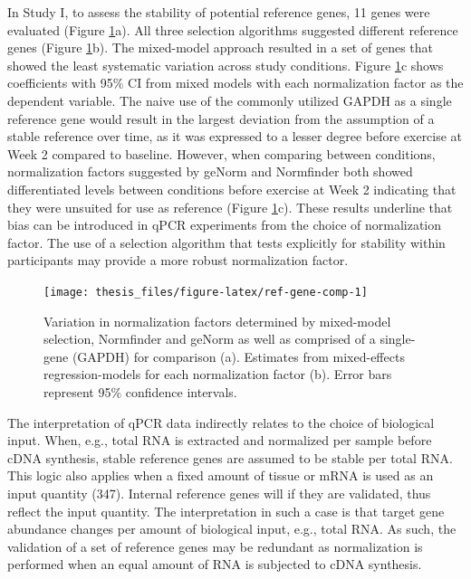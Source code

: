 \documentclass[twoside,10pt]{gihclass} %
\begin{document}
In Study I, to assess the stability of potential reference genes, 11 genes were evaluated (Figure \ref{fig:ref-gene-comp}a). All three selection algorithms suggested different reference genes (Figure \ref{fig:ref-gene-comp}b). The mixed-model approach resulted in a set of genes that showed the least systematic variation across study conditions. Figure \ref{fig:ref-gene-comp}c shows coefficients with 95\% CI from mixed models with each normalization factor as the dependent variable. The naive use of the commonly utilized GAPDH as a single reference gene would result in the largest deviation from the assumption of a stable reference over time, as it was expressed to a lesser degree before exercise at Week 2 compared to baseline. However, when comparing between conditions, normalization factors suggested by geNorm and Normfinder both showed differentiated levels between conditions before exercise at Week 2 indicating that they were unsuited for use as reference (Figure \ref{fig:ref-gene-comp}c). These results underline that bias can be introduced in qPCR experiments from the choice of normalization factor. The use of a selection algorithm that tests explicitly for stability within participants may provide a more robust normalization factor.
\begin{figure}

{\centering \texttt{[image: thesis\_files/figure-latex/ref-gene-comp-1]} 

}

\caption[Reference gene selection in Study I]{Variation in normalization factors determined by mixed-model selection, Normfinder and geNorm as well as comprised of a single-gene (GAPDH) for comparison (a). Estimates from mixed-effects regression-models for each normalization factor (b). Error bars represent 95\% confidence intervals.}\label{fig:ref-gene-comp}
\end{figure}
The interpretation of qPCR data indirectly relates to the choice of biological input. When, e.g., total RNA is extracted and normalized per sample before cDNA synthesis, stable reference genes are assumed to be stable per total RNA. This logic also applies when a fixed amount of tissue or mRNA is used as an input quantity
(347).
Internal reference genes will if they are validated, thus reflect the input quantity. The interpretation in such a case is that target gene abundance changes per amount of biological input, e.g., total RNA.
As such, the validation of a set of reference genes may be redundant as normalization is performed when an equal amount of RNA is subjected to cDNA synthesis.
\end{document}
